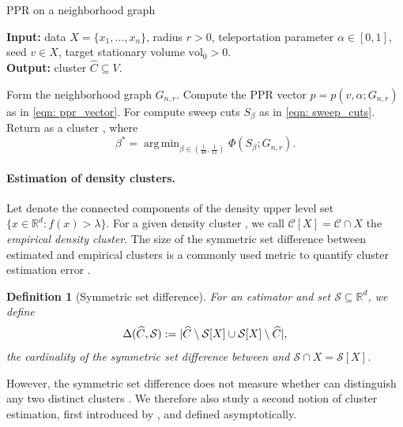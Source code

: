 \documentclass{article}
\DeclarePairedDelimiter\abs{\lvert}{\rvert}
\newcommand{\vol}{\mathrm{vol}}
\newcommand{\Reals}{\mathbb{R}}
\newcommand{\Rd}{\Reals^d}
\newcommand{\1}{\mathbf{1}}
\newcommand{\pbf}{p}        %
\newcommand{\Xbf}{X}             %
\newcommand{\Cbb}{\mathbb{C}}
\newcommand{\Cset}{\mathcal{C}}
\newcommand{\Cest}{\widehat{C}}
\DeclareMathOperator*{\argmin}{arg\,min}
\theoremstyle{aldenthm}
\newtheorem{definition}{Definition}
\theoremstyle{aldenrmrk}
\begin{document}
\begin{algorithm}
\caption{PPR on a neighborhood graph}
\label{alg: ppr}	
{\bfseries Input:} data $\Xbf=\{x_1,\ldots,x_n\}$, radius $r > 0$, teleportation
parameter $\alpha \in [0,1]$, seed $v \in \Xbf$, target stationary volume
$\vol_0 > 0$. \\     
{\bfseries Output:} cluster $\Cest \subseteq V$.
\begin{algorithmic}[1]
  \STATE Form the neighborhood graph $G_{n,r}$.
  \STATE Compute the PPR vector $p=\pbf(v, \alpha; G_{n,r})$ as in \eqref{eqn: 
    ppr_vector}. 
  \STATE For  compute sweep cuts 
  $S_{\beta}$ as in \eqref{eqn: sweep_cuts}.
  \STATE Return as a cluster \smash{$\Cest = S_{\beta^*}$}, where  
  $$
  \beta^* = \argmin_{\beta \in (\frac{1}{40}, \frac{1}{11})} \Phi(S_{\beta}; G_{n,r}).
  $$
\end{algorithmic}
\end{algorithm}

\paragraph{Estimation of density clusters.} Let \smash{$\Cbb_f(\lambda)$} denote 
the connected components of the density upper level set $\{x \in \Rd: f(x) >
\lambda\}$.  For a given density cluster \smash{$\Cset \in \Cbb_f(\lambda)$}, we
call $\Cset[\Xbf] = \Cset \cap \Xbf$ the \emph{empirical density cluster}. The
size of the symmetric set difference between estimated and empirical clusters is 
a commonly used metric to quantify cluster estimation error
\citep{korostelev1993,polonik1995,rigollet2009}.  

\begin{definition}[Symmetric set difference]
  \label{def: symmetric_set_diff}
  For an estimator \smash{$\Cest \subseteq \Xbf$} and set
  $\mathcal{S} \subseteq \Reals^d$, we define   
  \begin{equation}
    \label{eqn: misclassification_rate}
    \Delta(\Cest, \mathcal{S}) := \abs{\Cest \setminus \mathcal{S}[\Xbf] \cup
      \mathcal{S}[\Xbf] \setminus \Cest},
  \end{equation}
  the cardinality of the symmetric set difference between 
  \smash{$\Cest$} and $\mathcal{S} \cap \Xbf = \mathcal{S}[\Xbf]$. 
\end{definition}

However, the symmetric set difference does not measure whether \smash{$\Cest$} 
can distinguish any two distinct clusters \smash{$\Cset,\Cset' \in
  \Cbb_f(\lambda)$}. We therefore also study a second notion of cluster
estimation, first introduced by \citet{hartigan1981}, and defined
asymptotically. 
\end{document}
